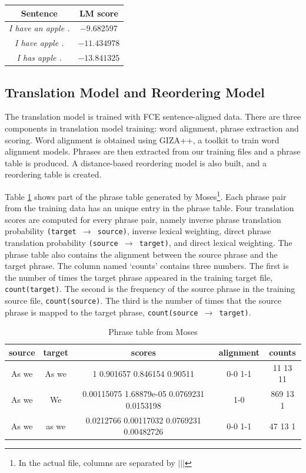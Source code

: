 \documentclass[12pt,a4paper,twoside,openright]{report}
\begin{document}
\begin{center}
\begin{tabular}{ c | c }
 \textbf{Sentence} & \textbf{LM score} \\ 
 \hline
 \textit{I have an apple .} & $-9.682597$ \\ 
 \textit{I have apple .} & $-11.434978$ \\ 
 \textit{I has apple .} & $-13.841325$ 
\end{tabular}
\end{center}

\subsection{Translation Model and Reordering Model}\label{section:moses_tm}
The translation model is trained with FCE sentence-aligned data. There are three components in translation model training: word alignment, phrase extraction and scoring. Word alignment is obtained using GIZA++, a toolkit to train word alignment models. Phrases are then extracted from our training files and a phrase table is produced. A distance-based reordering model is also built, and a reordering table is created. 

Table \ref{table:phrase_table} shows part of the phrase table generated by Moses\footnote{In the actual file, columns are separated by $\vert\vert\vert$}. Each phrase pair from the training data has an unique entry in the phrase table. Four translation scores are computed for every phrase pair, namely inverse phrase translation probability \texttt{(target $\rightarrow$ source)}, inverse lexical weighting, direct phrase translation probability \texttt{(source $\rightarrow$ target)}, and direct lexical weighting. The phrase table also contains the alignment between the source phrase and the target phrase. The column named `counts' contains three numbers. The first is the number of times the target phrase appeared in the training target file, \texttt{count(target)}. The second is the frequency of the source phrase in the training source file, \texttt{count(source)}. The third is the number of times that the source phrase is mapped to the target phrase, \texttt{count(source $\rightarrow$ target)}.

\begin{table}[ht]
\centering
\begin{tabular}{ |c|c|c|c|c| } 
 \hline
 source & target & scores & alignment & counts \\ [0.5ex] 
 \hline
 As we & As we & 1 0.901657 0.846154 0.90511 & 0-0 1-1 & 11 13 11\\
 As we & We & 0.00115075 1.68879e-05 0.0769231 0.0153198 & 1-0 & 869 13 1\\
 As we & as we & 0.0212766 0.00117032 0.0769231 0.00482726 & 0-0 1-1 & 47 13 1\\
 \hline
\end{tabular}
\caption{Phrase table from Moses}
\label{table:phrase_table}
\end{table}
\end{document}
